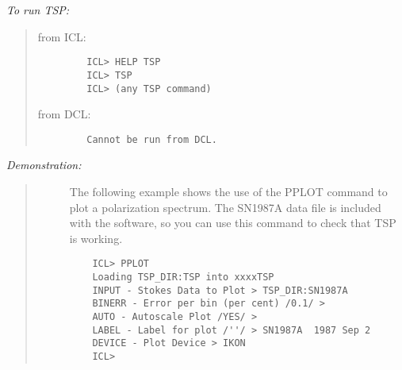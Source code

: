 {\em To run TSP:}\hfill
\begin{quote}
\begin{description}

\item [from ICL:]\hfill

\begin{small}
\begin{verbatim}
   ICL> HELP TSP
   ICL> TSP
   ICL> (any TSP command)
\end{verbatim}
\end{small}

\item [from DCL:]\hfill

\begin{small}
\begin{verbatim}
   Cannot be run from DCL.
\end{verbatim}
\end{small}

\end{description}
\end{quote}

{\em Demonstration:}\hfill
\begin{quote}
\begin{description}
\item [] The following example shows the use of the PPLOT command to plot a
polarization spectrum.
The SN1987A data file is included with the software, so you can use this
command to check that TSP is working.

\begin{small}
\begin{verbatim}
    ICL> PPLOT
    Loading TSP_DIR:TSP into xxxxTSP
    INPUT - Stokes Data to Plot > TSP_DIR:SN1987A
    BINERR - Error per bin (per cent) /0.1/ >
    AUTO - Autoscale Plot /YES/ >
    LABEL - Label for plot /''/ > SN1987A  1987 Sep 2
    DEVICE - Plot Device > IKON
    ICL>
\end{verbatim}
\end{small}

\end{description}
\end{quote}

